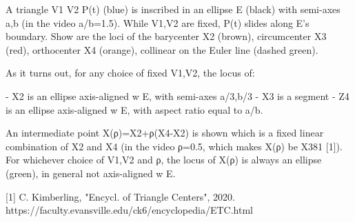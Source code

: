 A triangle V1 V2 P(t) (blue) is inscribed in an ellipse E (black) with semi-axes a,b (in the video a/b=1.5). While V1,V2 are fixed, P(t) slides along E's boundary. Show are the loci of the barycenter X2 (brown), circumcenter X3 (red), orthocenter X4 (orange), collinear on the Euler line (dashed green). 

As it turns out, for any choice of fixed V1,V2, the locus of:

- X2 is an ellipse axis-aligned w E, with semi-axes a/3,b/3
- X3 is a segment
- Z4 is an ellipse axis-aligned w E, with aspect ratio equal to a/b.

An intermediate point X(ρ)=X2+ρ(X4-X2) is shown which is a fixed linear combination of X2 and X4 (in the video ρ=0.5, which makes X(ρ) be X381 [1]). For whichever choice of V1,V2 and ρ, the locus of X(ρ) is always an ellipse (green), in general not axis-aligned w E.

[1] C. Kimberling, "Encycl. of Triangle Centers", 2020. https://faculty.evansville.edu/ck6/encyclopedia/ETC.html